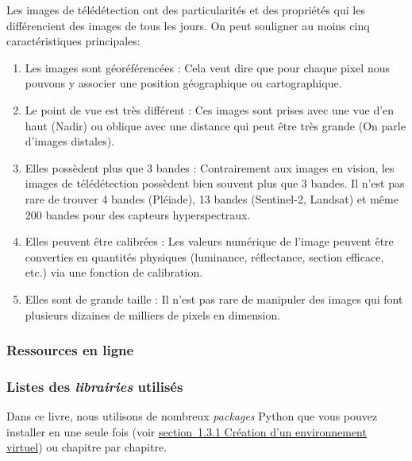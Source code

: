 \documentclass[
]{article}
\begin{document}
Les images de télédétection ont des particularités et des propriétés qui
les différencient des images de tous les jours. On peut souligner au
moins cinq caractéristiques principales:

\begin{enumerate}
\def\labelenumi{\arabic{enumi}.}
\item
  Les images sont géoréférencées : Cela veut dire que pour chaque pixel
  nous pouvons y associer une position géographique ou cartographique.
\item
  Le point de vue est très différent : Ces images sont prises avec une
  vue d'en haut (Nadir) ou oblique avec une distance qui peut être très
  grande (On parle d'images distales).
\item
  Elles possèdent plus que 3 bandes : Contrairement aux images en
  vision, les images de télédétection possèdent bien souvent plus que 3
  bandes. Il n'est pas rare de trouver 4 bandes (Pléiade), 13 bandes
  (Sentinel-2, Landsat) et même 200 bandes pour des capteurs
  hyperspectraux.
\item
  Elles peuvent être calibrées : Les valeurs numérique de l'image
  peuvent être converties en quantités physiques (luminance,
  réflectance, section efficace, etc.) via une fonction de calibration.
\item
  Elles sont de grande taille : Il n'est pas rare de manipuler des
  images qui font plusieurs dizaines de milliers de pixels en dimension.
\end{enumerate}

\subsubsection{Ressources en ligne}\label{ressources-en-ligne}

\label{sect0071}
\subsubsection*{\texorpdfstring{Listes des \emph{librairies}
utilisés}{Listes des librairies utilisés}}\label{listes-des-librairies-utilisuxe9s}

Dans ce livre, nous utilisons de nombreux \emph{packages} Python que
vous pouvez installer en une seule fois (voir
\href{00-PriseEnMainPython.html\#sec-00-01}{section~{1.3.1 Création d'un
environnement virtuel}}) ou chapitre par chapitre.
\end{document}
